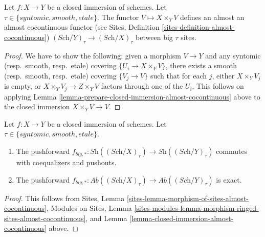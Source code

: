 \begin{lemma}
\label{lemma-closed-immersion-almost-cocontinuous}
Let $f : X \to Y$ be a closed immersion of schemes.
Let $\tau \in \{syntomic, smooth, etale\}$.
The functor $V \mapsto X \times_Y V$ defines an almost
an almost cocontinuous functor (see
Sites, Definition \ref{sites-definition-almost-cocontinuous})
$(\textit{Sch}/Y)_\tau \to (\textit{Sch}/X)_\tau$ between
big $\tau$ sites.
\end{lemma}

\begin{proof}
We have to show the following: given a morphism $V \to Y$
and any syntomic (resp.\ smooth, resp.\ etale)
covering $\{U_i \to X \times_Y V\}$, there exists a
smooth (resp.\ smooth, resp.\ etale) covering $\{V_j \to V\}$
such that for each $j$, either $X \times_Y V_j$ is empty, or
$X \times_Y V_j \to Z \times_Y V$ factors through one of
the $U_i$. This follows on applying
Lemma \ref{lemma-prepare-closed-immersion-almost-cocontinuous}
above to the closed immersion $X \times_Y V \to V$.
\end{proof}

\begin{lemma}
\label{lemma-closed-immersion-pushforward-exact}
Let $f : X \to Y$ be a closed immersion of schemes.
Let $\tau \in \{syntomic, smooth, etale\}$.
\begin{enumerate}
\item The pushforward
$f_{big, *} :
\textit{Sh}((\textit{Sch}/X)_\tau)
\to
\textit{Sh}((\textit{Sch}/Y)_\tau)$
commutes with coequalizers and pushouts.
\item The pushforward
$f_{big, *} :
\textit{Ab}((\textit{Sch}/X)_\tau)
\to
\textit{Ab}((\textit{Sch}/Y)_\tau)$
is exact.
\end{enumerate}
\end{lemma}

\begin{proof}
This follows from
Sites, Lemma \ref{sites-lemma-morphism-of-sites-almost-cocontinuous},
Modules on Sites,
Lemma \ref{sites-modules-lemma-morphism-ringed-sites-almost-cocontinuous},
and
Lemma \ref{lemma-closed-immersion-almost-cocontinuous}
above.
\end{proof}

